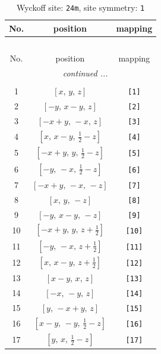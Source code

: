 \documentclass[fleqn,8pt]{jsarticle}
\begin{document}
\begin{longtable}{ccc}
\caption{Wyckoff site: {\tt 24m}, site symmetry: {\tt 1}}
 \\
 \hline \hline
No. & position & mapping \\ \hline \endfirsthead

\multicolumn{2}{l}{\tablename\ \thetable{}} \\
 \hline \hline
No. & position & mapping \\ \hline \endhead

 \hline \hline
\multicolumn{2}{r}{\footnotesize\it continued ...} \\ \endfoot

 \hline \hline
\multicolumn{2}{r}{} \\ \endlastfoot

1 & $\left[ x,\, y,\, z \right]$ & {\tt [1]} \\ \hline
2 & $\left[ - y,\, x - y,\, z \right]$ & {\tt [2]} \\ \hline
3 & $\left[ - x + y,\, - x,\, z \right]$ & {\tt [3]} \\ \hline
4 & $\left[ x,\, x - y,\, \frac{1}{2} - z \right]$ & {\tt [4]} \\ \hline
5 & $\left[ - x + y,\, y,\, \frac{1}{2} - z \right]$ & {\tt [5]} \\ \hline
6 & $\left[ - y,\, - x,\, \frac{1}{2} - z \right]$ & {\tt [6]} \\ \hline
7 & $\left[ - x + y,\, - x,\, - z \right]$ & {\tt [7]} \\ \hline
8 & $\left[ x,\, y,\, - z \right]$ & {\tt [8]} \\ \hline
9 & $\left[ - y,\, x - y,\, - z \right]$ & {\tt [9]} \\ \hline
10 & $\left[ - x + y,\, y,\, z + \frac{1}{2} \right]$ & {\tt [10]} \\ \hline
11 & $\left[ - y,\, - x,\, z + \frac{1}{2} \right]$ & {\tt [11]} \\ \hline
12 & $\left[ x,\, x - y,\, z + \frac{1}{2} \right]$ & {\tt [12]} \\ \hline
13 & $\left[ x - y,\, x,\, z \right]$ & {\tt [13]} \\ \hline
14 & $\left[ - x,\, - y,\, z \right]$ & {\tt [14]} \\ \hline
15 & $\left[ y,\, - x + y,\, z \right]$ & {\tt [15]} \\ \hline
16 & $\left[ x - y,\, - y,\, \frac{1}{2} - z \right]$ & {\tt [16]} \\ \hline
17 & $\left[ y,\, x,\, \frac{1}{2} - z \right]$ & {\tt [17]} \\ \hline

\end{longtable}
\end{document}
